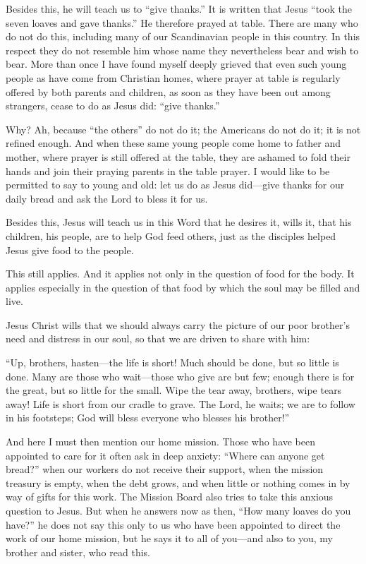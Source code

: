 Besides this, he will teach us to “give thanks.” It is written that Jesus “took the seven loaves and gave thanks.” He therefore prayed at table. There are many who do not do this, including many of our Scandinavian people in this country. In this respect they do not resemble him whose name they nevertheless bear and wish to bear. More than once I have found myself deeply grieved that even such young people as have come from Christian homes, where prayer at table is regularly offered by both parents and children, as soon as they have been out among strangers, cease to do as Jesus did: “give thanks.”

Why? Ah, because “the others” do not do it; the Americans do not do it; it is not refined enough. And when these same young people come home to father and mother, where prayer is still offered at the table, they are ashamed to fold their hands and join their praying parents in the table prayer. I would like to be permitted to say to young and old: let us do as Jesus did—give thanks for our daily bread and ask the Lord to bless it for us.

Besides this, Jesus will teach us in this Word that he desires it, wills it, that his children, his people, are to help God feed others, just as the disciples helped Jesus give food to the people.

This still applies. And it applies not only in the question of food for the body. It applies especially in the question of that food by which the soul may be filled and live.

Jesus Christ wills that we should always carry the picture of our poor brother’s need and distress in our soul, so that we are driven to share with him:

“Up, brothers, hasten—the life is short!
Much should be done, but so little is done.
Many are those who wait—those who give are but few;
enough there is for the great, but so little for the small.
Wipe the tear away, brothers, wipe tears away!
Life is short from our cradle to grave.
The Lord, he waits; we are to follow in his footsteps;
God will bless everyone who blesses his brother!”

And here I must then mention our home mission. Those who have been appointed to care for it often ask in deep anxiety: “Where can anyone get bread?” when our workers do not receive their support, when the mission treasury is empty, when the debt grows, and when little or nothing comes in by way of gifts for this work. The Mission Board also tries to take this anxious question to Jesus. But when he answers now as then, “How many loaves do you have?” he does not say this only to us who have been appointed to direct the work of our home mission, but he says it to all of you—and also to you, my brother and sister, who read this.

